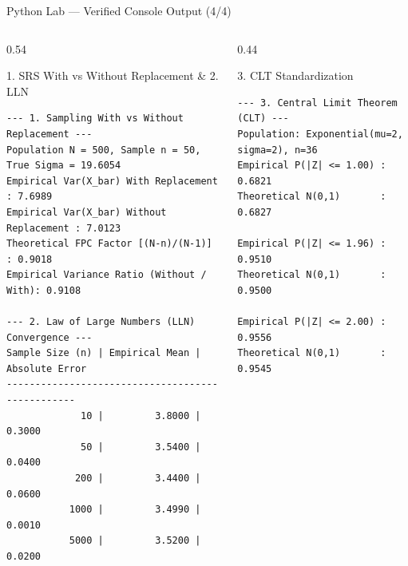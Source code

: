 \documentclass[10pt, aspectratio=169]{beamer}
\begin{document}
\begin{frame}[fragile]{Python Lab --- Verified Console Output (4/4)}
  \vspace{-0.1cm}
  \begin{columns}[T]
    \begin{column}{0.54\textwidth}
      \begin{block}{1. SRS With vs Without Replacement \& 2. LLN}
        \fontsize{4.4pt}{5.2pt}\selectfont
\begin{verbatim}
--- 1. Sampling With vs Without Replacement ---
Population N = 500, Sample n = 50, True Sigma = 19.6054
Empirical Var(X_bar) With Replacement    : 7.6989
Empirical Var(X_bar) Without Replacement : 7.0123
Theoretical FPC Factor [(N-n)/(N-1)]     : 0.9018
Empirical Variance Ratio (Without / With): 0.9108

--- 2. Law of Large Numbers (LLN) Convergence ---
Sample Size (n) | Empirical Mean | Absolute Error
-------------------------------------------------
             10 |         3.8000 |         0.3000
             50 |         3.5400 |         0.0400
            200 |         3.4400 |         0.0600
           1000 |         3.4990 |         0.0010
           5000 |         3.5200 |         0.0200
\end{verbatim}
      \end{block}
    \end{column}
    \begin{column}{0.44\textwidth}
      \begin{block}{3. CLT Standardization}
        \fontsize{4.4pt}{5.2pt}\selectfont
\begin{verbatim}
--- 3. Central Limit Theorem (CLT) ---
Population: Exponential(mu=2, sigma=2), n=36
Empirical P(|Z| <= 1.00) : 0.6821
Theoretical N(0,1)       : 0.6827

Empirical P(|Z| <= 1.96) : 0.9510
Theoretical N(0,1)       : 0.9500

Empirical P(|Z| <= 2.00) : 0.9556
Theoretical N(0,1)       : 0.9545
\end{verbatim}
      \end{block}
    \end{column}
  \end{columns}
\end{frame}
\end{document}
